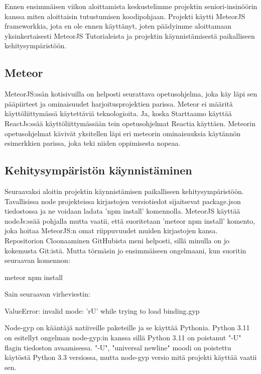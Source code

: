 
Ennen ensimmäisen viikon aloittamista keskustelimme projektin seniori-insinöörin kanssa miten aloittaisin tutustumisen koodipohjaan.
Projekti käytti MeteorJS frameworkkia, jota en ole ennen käyttänyt, joten päädyimme aloittamaan yksinkertaisesti MeteorJS Tutorialeista ja projektin käynnistämisestä paikalliseen kehitysympäristöön.\medskip

\subsection*{Meteor}

MeteorJS:ssän kotisivuilla on helposti seurattava opetusohjelma, joka käy läpi sen pääpiirteet ja ominaisuudet harjoitusprojektien parissa. 
Meteor ei määritä käyttöliittymässä käytettäviä teknologioita. Ja, koska Starttaamo käyttää ReactJs:ssää käyttöliittymässään tein opetusohjelmat Reactia käyttäen.
Meteorin opetusohjelmat kävivät yksitellen läpi eri meteorin ominaisuuksia käytännön esimerkkien parissa, joka teki niiden oppimisesta nopeaa.\medskip




\subsection*{Kehitysympäristön käynnistäminen}

Seuraavaksi aloitin projektin käynnistämisen paikalliseen kehitysympäristöön.
Tavallisissa node projekteissa kirjastojen versiotiedot sijaitsevat package.json tiedostossa ja ne voidaan ladata 'npm install' komennolla.
MeteorJS käyttää nodeJs:ssää pohjalla mutta vaatii, että suoritetaan 'meteor npm install' komento, joka hoitaa MeteorJS:n omat riippuvuudet muiden kirjastojen kansa.
Repositorion Cloonaaminen GitHubista meni helposti, sillä minulla on jo kokemusta Git:istä. Mutta törmäsin jo ensimmäiseen ongelmaani, kun suoritin seuraavan komennon:

\begin{tcolorbox}
meteor npm install
\end{tcolorbox}
\medskip


Sain seuraavan virheviestin:


\begin{tcolorbox}
ValueError: invalid mode: 'rU' while trying to load binding.gyp
\end{tcolorbox}\medskip


Node-gyp on kääntäjä natiiveille paketeille ja se käyttää Pythonia.
Python 3.11 on esitellyt ongelman node-gyp:in kanssa sillä Python 3.11 on poistanut "{}-U"{} flagin tiedoston avaamisessa.
"{}-U", "universal newline"{} moodi on poistettu käytöstä Python 3.3 versiossa, mutta node-gyp versio mitä projekti käyttää vaatii sen.\medskip



